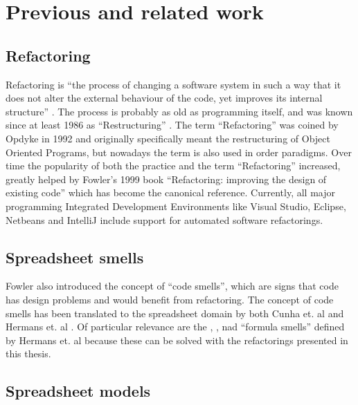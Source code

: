 
\chapter{Previous and related work}
\label{chapter:previouswork}

\section{Refactoring}

Refactoring is ``the process of changing a software system in such a way that it does not alter the external behaviour of the code, yet improves its internal structure'' \cite{opdyke1992refactoring}.
The process is probably as old as programming itself, and was known since at least 1986 as ``Restructuring'' \cite{arnold1986introduction}.
The term ``Refactoring'' was coined by Opdyke in 1992 \cite{opdyke1992refactoring} and originally specifically meant the restructuring of Object Oriented Programs, but nowadays the term is also used in order paradigms.
Over time the popularity of both the practice and the term ``Refactoring'' increased, greatly helped by Fowler's 1999 book ``Refactoring: improving the design of existing code'' \cite{fowler1999refactoring} which has become the canonical reference.
Currently, all major programming Integrated Development Environments like Visual Studio, Eclipse, Netbeans and IntelliJ include support for automated software refactorings.

\section{Spreadsheet smells}

Fowler \cite{fowler1999refactoring} also introduced the concept of ``code smells'', which are signs that code has design problems and would benefit from refactoring.
The concept of code smells has been translated to the spreadsheet domain by both Cunha et. al \cite{cunha2012towards} and Hermans et. al \cite{hermans2012detecting, DBLP:conf/icsm/Hermans212, hermans2014detecting}.
Of particular relevance are the , ,  nad  ``formula smells'' defined by Hermans et. al \cite{DBLP:conf/icsm/Hermans212,hermans2014detecting} because these can be solved with the refactorings presented in this thesis.

\section{Spreadsheet models}

